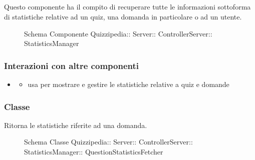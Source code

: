 \subsection{}
Questo componente ha il compito di recuperare tutte le informazioni sottoforma di statistiche relative ad un quiz, una domanda in particolare o ad un utente.
\begin{figure}[H]
\centering
\noindent{}
\caption[Schema Componente StatisticsManager]{Schema Componente Quizzipedia:: Server:: ControllerServer:: StatisticsManager}
\end{figure}
\subsubsection{Interazioni con altre componenti}
\begin{itemize}
\item {}
\begin{itemize}
\item usa  per mostrare e gestire le statistiche relative a quiz e domande
\end{itemize}
\end{itemize}
\subsubsection{Classe }
Ritorna le statistiche riferite ad una domanda.
\begin{figure}[H]
\centering
\noindent{}
\caption[Schema Classe QuestionStatisticsFetcher]{Schema Classe Quizzipedia:: Server:: ControllerServer:: StatisticsManager:: QuestionStatisticsFetcher}
\end{figure}
